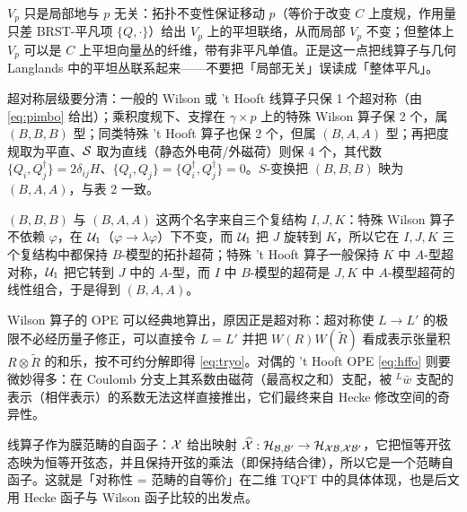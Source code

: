 \begin{yizhu}[易错点]
$V_p$ 只是局部地与 $p$ 无关：拓扑不变性保证移动 $p$（等价于改变 $C$ 上度规，作用量只差 BRST-平凡项 $\{Q,\cdot\}$）给出 $V_p$ 上的平坦联络，从而局部 $V_p$ 不变；但整体上 $V_p$ 可以是 $C$ 上平坦向量丛的纤维，带有非平凡单值。正是这一点把线算子与几何 Langlands 中的平坦丛联系起来——不要把「局部无关」误读成「整体平凡」。
\end{yizhu}

\begin{yizhu}[易错点]
超对称层级要分清：一般的 Wilson 或 't Hooft 线算子只保 1 个超对称（由 \eqref{eq:pimbo} 给出）；乘积度规下、支撑在 $\gamma\times p$ 上的特殊 Wilson 算子保 2 个，属 $(B,B,B)$ 型；同类特殊 't Hooft 算子也保 2 个，但属 $(B,A,A)$ 型；再把度规取为平直、${{\cal S}}$ 取为直线（静态外电荷/外磁荷）则保 4 个，其代数 $\{Q_i,Q^\dagger_j\}=2\delta_{ij}H$、$\{Q_i,Q_j\}=\{Q^\dagger_i,Q^\dagger_j\}=0$。$S$-变换把 $(B,B,B)$ 映为 $(B,A,A)$，与表 2 一致。
\end{yizhu}

\begin{yizhu}[物理图像]
$(B,B,B)$ 与 $(B,A,A)$ 这两个名字来自三个复结构 $I,J,K$：特殊 Wilson 算子不依赖 $\varphi$，在 ${\cal U}_1$（$\varphi\to\lambda\varphi$）下不变，而 ${\cal U}_1$ 把 $J$ 旋转到 $K$，所以它在 $I,J,K$ 三个复结构中都保持 $B$-模型的拓扑超荷；特殊 't Hooft 算子一般保持 $K$ 中 $A$-型超对称，${\cal U}_1$ 把它转到 $J$ 中的 $A$-型，而 $I$ 中 $B$-模型的超荷是 $J,K$ 中 $A$-模型超荷的线性组合，于是得到 $(B,A,A)$。
\end{yizhu}

\begin{yizhu}[物理图像]
Wilson 算子的 OPE 可以经典地算出，原因正是超对称：超对称使 $L\to L'$ 的极限不必经历量子修正，可以直接令 $L=L'$ 并把 $W(R)W(\tilde R)$ 看成表示张量积 $R\otimes\tilde R$ 的和乐，按不可约分解即得 \eqref{eq:tryo}。对偶的 't Hooft OPE \eqref{eq:hffo} 则要微妙得多：在 Coulomb 分支上其系数由磁荷（最高权之和）支配，被 $^L\bar w$ 支配的表示（相伴表示）的系数无法这样直接推出，它们最终来自 Hecke 修改空间的奇异性。
\end{yizhu}

\begin{yizhu}[物理图像]
线算子作为膜范畴的自函子：$\EUX$ 给出映射 $\hat\EUX:{\cal H}_{{\cal B},{\cal B}'}\to{\cal H}_{\EUX{\cal B},\EUX{\cal B}'}$，它把恒等开弦态映为恒等开弦态，并且保持开弦的乘法（即保持结合律），所以它是一个范畴自函子。这就是「对称性 = 范畴的自等价」在二维 TQFT 中的具体体现，也是后文用 Hecke 函子与 Wilson 函子比较的出发点。
\end{yizhu}
